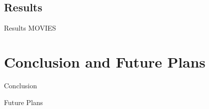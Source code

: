 \documentclass{beamer}
\begin{document}
\subsection{Results}
\begin{frame}
\begin{block}{Results}
MOVIES
\end{block}
\end{frame}
\section{Conclusion and Future Plans}
\begin{frame}
\begin{block}{Conclusion}

\end{block}
\end{frame}
\begin{frame}
\begin{block}{Future Plans}

\end{block}
\end{frame}

\end{document}
